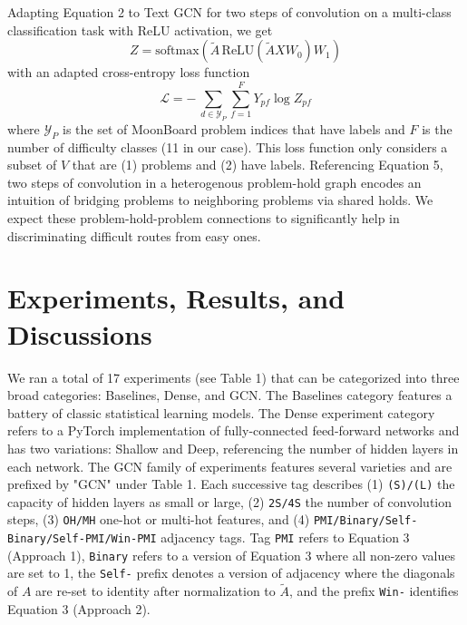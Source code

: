 \documentclass{article}
\begin{document}
Adapting Equation 2 to Text GCN for two steps of convolution on a multi-class classification task with ReLU activation, we get
\begin{equation}
Z = \text{softmax}(\widetilde{A}\,\text{ReLU}(\widetilde{A}XW_{0})W_{1})
\end{equation}
with an adapted cross-entropy loss function
\begin{equation}
\mathcal{L} = -\,\sum_{d\in\mathcal{Y}_P} \sum_{f=1}^{F} Y_{pf}\log Z_{pf}
\end{equation}
where $\mathcal{Y}_P$ is the set of MoonBoard problem indices that have labels and $F$ is the number of difficulty classes (11 in our case). This loss function only considers a subset of $V$ that are (1) problems and (2) have labels. Referencing Equation 5, two steps of convolution in a heterogenous problem-hold graph encodes an intuition of bridging problems to neighboring problems via shared holds. We expect these problem-hold-problem connections to significantly help in discriminating difficult routes from easy ones. 

\section{Experiments, Results, and Discussions}
We ran a total of 17 experiments (see Table 1) that can be categorized into three broad categories: Baselines, Dense, and GCN. The Baselines category features a battery of classic statistical learning models. The Dense experiment category refers to a PyTorch implementation of fully-connected feed-forward networks and has two variations: Shallow and Deep, referencing the number of hidden layers in each network. The GCN family of experiments features several varieties and are prefixed by "GCN" under Table 1. Each successive tag describes (1) \texttt{(S)/(L)} the capacity of hidden layers as small or large, (2) \texttt{2S/4S} the number of convolution steps, (3) \texttt{OH/MH} one-hot or multi-hot features, and (4) \texttt{PMI/Binary/Self-Binary/Self-PMI/Win-PMI} adjacency tags. Tag \texttt{PMI} refers to Equation 3 (Approach 1), \texttt{Binary} refers to a version of Equation 3 where all non-zero values are set to 1, the \texttt{Self-} prefix denotes a version of adjacency where the diagonals of $A$ are re-set to identity after normalization to $\widetilde{A}$, and the prefix \texttt{Win-} identifies Equation 3 (Approach 2). 
\end{document}
